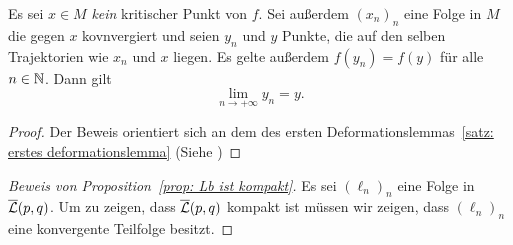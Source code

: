 \begin{lemma}
    \label{lemma: konvergenz einer folge}
    Es sei $x \in M$ \emph{kein} kritischer Punkt von $f$. Sei außerdem $(x_n)_n$ eine Folge in
    $M$ die gegen $x$ kovnvergiert und seien $y_n$ und $y$ Punkte, die auf den selben Trajektorien
    wie $x_n$ und $x$ liegen. Es gelte außerdem $f(y_n) = f(y)$ für alle $n \in { \mathbb N }$. Dann gilt
    \[ \lim_{n \to + \infty} y_n = y . \]
\end{lemma}

\begin{proof}
    Der Beweis orientiert sich an dem des ersten Deformationslemmas~\ref{satz: erstes deformationslemma}
    (Siehe \cite{audin})
\end{proof}

\begin{proof}[Beweis von Proposition~\ref{prop: Lb ist kompakt}]
    Es sei $(\ell_n)_n$ eine Folge in ${\overline{\mathcal{L}} } (p, q)$. Um zu zeigen, dass ${\overline{\mathcal{L}} } (p, q)$ kompakt ist
    müssen wir zeigen, dass $(\ell_n)_n$ eine konvergente Teilfolge besitzt.


\end{proof}
